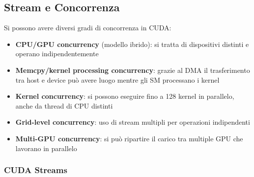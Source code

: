 \newpage

%
%


\subsection{Stream e Concorrenza}

Si possono avere diversi gradi di concorrenza in CUDA: 
\begin{itemize}
	\item \textbf{CPU/GPU concurrency} (modello ibrido): si tratta di dispositivi distinti e operano indipendentemente
	\item \textbf{Memcpy/kernel processing concurrency}: grazie al DMA il trasferimento tra host e device può avere luogo mentre gli SM processano i kernel
	\item \textbf{Kernel concurrency}: si possono eseguire fino a 128 kernel in parallelo, anche da thread di CPU distinti
	\item \textbf{Grid-level concurrency}: uso di stream multipli per operazioni indipendenti
	\item \textbf{Multi-GPU concurrency}: si può ripartire il carico tra multiple GPU che lavorano in parallelo
\end{itemize}

\subsubsection{CUDA Streams}

